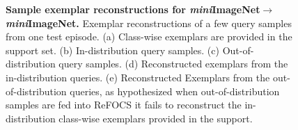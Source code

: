 \begin{figure}[ht]
\centering
\vspace{-1em}
\captionsetup[subfigure]{justification=centering}
\hfill
{} 
\hfill
{} 
\hfill
{} 
	\hfill
{} 
	
\caption{\textbf{Sample exemplar reconstructions for \textit{mini}ImageNet$\rightarrow$\textit{mini}ImageNet.} Exemplar reconstructions of a few query samples from one test episode. (a) Class-wise exemplars are provided in the support set. (b) In-distribution query samples. (c) Out-of-distribution query samples. (d) Reconstructed exemplars from the in-distribution queries. (e) Reconstructed Exemplars from the out-of-distribution queries, as hypothesized when out-of-distribution samples are fed into ReFOCS it fails to reconstruct the in-distribution class-wise exemplars provided in the support.}
\label{fig:exemp_recon_mini}
\end{figure}